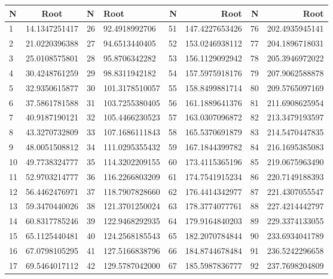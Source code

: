 \documentclass{amsproc}
\theoremstyle{definition}
\theoremstyle{remark}
\numberwithin{equation}{section}
\begin{document}
\begin{center}
  \begin{tabular}{ | l | c || l | l || r | r || r | r | }
    \hline
    N & Root & N & Root & N & Root & N & Root \\ \hline \hline
    1 & 14.1347251417  & 26 & 92.4918992706  & 51 & 147.4227653426  & 76 & 202.4935945141  \\ \hline 
    2 & 21.0220396388  & 27 & 94.6513440405  & 52 & 153.0246938112  & 77 & 204.1896718031  \\ \hline 
    3 & 25.0108575801  & 28 & 95.8706342282  & 53 & 156.1129092942  & 78 & 205.3946972022  \\ \hline 
    4 & 30.4248761259  & 29 & 98.8311942182  & 54 & 157.5975918176  & 79 & 207.9062588878  \\ \hline 
    5 & 32.9350615877  & 30 & 101.3178510057  & 55 & 158.8499881714  & 80 & 209.5765097169  \\ \hline 
    6 & 37.5861781588  & 31 & 103.7255380405  & 56 & 161.1889641376  & 81 & 211.6908625954  \\ \hline 
    7 & 40.9187190121  & 32 & 105.4466230523  & 57 & 163.0307096872  & 82 & 213.3479193597  \\ \hline 
    8 & 43.3270732809  & 33 & 107.1686111843  & 58 & 165.5370691879  & 83 & 214.5470447835  \\ \hline 
    9 & 48.0051508812  & 34 & 111.0295355432  & 59 & 167.1844399782  & 84 & 216.1695385083  \\ \hline 
    10 & 49.7738324777  & 35 & 114.3202209155  & 60 & 173.4115365196  & 85 & 219.0675963490  \\ \hline 
    11 & 52.9703214777  & 36 & 116.2266803209  & 61 & 174.7541915234  & 86 & 220.7149188393  \\ \hline 
    12 & 56.4462476971  & 37 & 118.7907828660  & 62 & 176.4414342977  & 87 & 221.4307055547  \\ \hline 
    13 & 59.3470440026  & 38 & 121.3701250024  & 63 & 178.3774077761  & 88 & 227.4214442797  \\ \hline 
    14 & 60.8317785246  & 39 & 122.9468292935  & 64 & 179.9164840203  & 89 & 229.3374133055  \\ \hline 
    15 & 65.1125440481  & 40 & 124.2568185543  & 65 & 182.2070784844  & 90 & 233.6934041789  \\ \hline 
    16 & 67.0798105295  & 41 & 127.5166838796  & 66 & 184.8744678484  & 91 & 236.5242296658  \\ \hline 
    17 & 69.5464017112  & 42 & 129.5787042000  & 67 & 185.5987836777  & 92 & 237.7698204809  \\ \hline 

\end{tabular}
\end{center}
\end{document}
